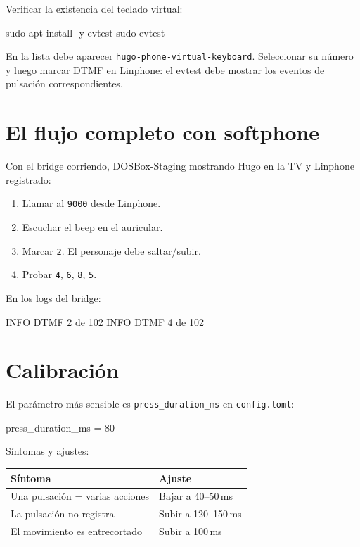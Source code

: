 Verificar la existencia del teclado virtual:

\begin{shellcode}
sudo apt install -y evtest
sudo evtest
\end{shellcode}

En la lista debe aparecer \texttt{hugo-phone-virtual-keyboard}. Seleccionar su número y luego marcar DTMF en Linphone: el evtest debe mostrar los eventos de pulsación correspondientes.

\section{El flujo completo con softphone}

Con el bridge corriendo, DOSBox-Staging mostrando Hugo en la TV y Linphone registrado:

\begin{enumerate}
  \item Llamar al \texttt{9000} desde Linphone.
  \item Escuchar el beep en el auricular.
  \item Marcar \texttt{2}. El personaje debe saltar/subir.
  \item Probar \texttt{4}, \texttt{6}, \texttt{8}, \texttt{5}.
\end{enumerate}

En los logs del bridge:

\begin{plaincode}
INFO DTMF 2 de 102
INFO DTMF 4 de 102
\end{plaincode}

\section{Calibración}

El parámetro más sensible es \texttt{press\_duration\_ms} en \texttt{config.toml}:

\begin{tomlcode}
[bridge]
press_duration_ms = 80
\end{tomlcode}

Síntomas y ajustes:

\begin{table}[h]
\centering
\begin{tabular}{ll}
\toprule
\textbf{Síntoma} & \textbf{Ajuste} \\
\midrule
Una pulsación = varias acciones & Bajar a 40--50\,ms \\
La pulsación no registra & Subir a 120--150\,ms \\
El movimiento es entrecortado & Subir a 100\,ms \\
\bottomrule
\end{tabular}
\end{table}

